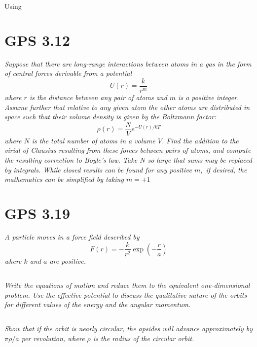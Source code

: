 \documentclass{article}
\begin{document}
Using 

\newpage



\section{GPS 3.12}
\textit{Suppose that there are long-range interactions between atoms in a gas in the form of central forces derivable from a potential
$$
U(r)=\frac{k}{r^{m}}
$$
where $r$ is the distance between any pair of atoms and $m$ is a positive integer. Assume further that relative to any given atom the other atoms are distributed in space such that their volume density is given by the Boltzmann factor:
$$
\rho(r)=\frac{N}{V} e^{-U(r) / k T}
$$
where $N$ is the total number of atoms in a volume $V$. Find the addition to the virial of Clausius resulting from these forces between pairs of atoms, and compute the resulting correction to Boyle's law. Take $N$ so large that sums may be replaced by integrals. While closed results can be found for any positive $m,$ if desired, the mathematics can be simplified by taking $m=+1$}
\newpage


\section{GPS 3.19}
\textit{A particle moves in a force field described by
$$
F(r)=-\frac{k}{r^{2}} \exp \left(-\frac{r}{a}\right)
$$
where $k$ and $a$ are positive.}


\subsection{}
\textit{Write the equations of motion and reduce them to the equivalent one-dimensional problem. Use the effective potential to discuss the qualitative nature of the orbits for different values of the energy and the angular momentum.}


\subsection{}
\textit{Show that if the orbit is nearly circular, the apsides will advance approximately by $\pi \rho / a$ per revolution, where $\rho$ is the radius of the circular orbit.}



\newpage
\end{document}
